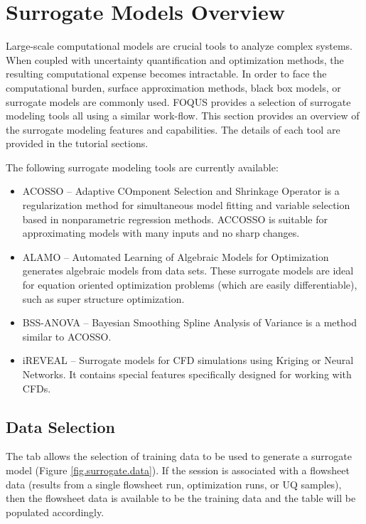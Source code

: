 \section{Surrogate Models Overview}

Large-scale computational models are crucial tools to analyze complex systems. When coupled with uncertainty quantification and optimization methods, the resulting computational expense becomes intractable. In order to face the computational burden, surface approximation methods, black box models, or surrogate models are commonly used. FOQUS provides a selection of surrogate modeling tools all using a similar work-flow. This section provides an overview of the surrogate modeling features and capabilities. The details of each tool are provided in the tutorial sections.

The following surrogate modeling tools are currently available:
\begin{itemize}
	\item ACOSSO -- Adaptive COmponent Selection and Shrinkage Operator is a regularization method for simultaneous model fitting and variable selection based in nonparametric regression methods. ACCOSSO is suitable for approximating models  with
     many inputs and no sharp changes.
	\item ALAMO -- Automated Learning of Algebraic Models for Optimization generates algebraic models from data sets. These surrogate models are ideal for equation
     oriented optimization problems (which are
     easily differentiable), such as super structure optimization.
	\item BSS-ANOVA -- Bayesian Smoothing Spline Analysis of Variance is a method similar to ACOSSO.
	\item iREVEAL -- Surrogate models for CFD simulations using Kriging or
     Neural Networks. It contains special features specifically designed
     for working with CFDs. 
\end{itemize}

\subsection{Data Selection}

The  tab allows the selection of training data to be used to generate a surrogate model (Figure \ref{fig.surrogate.data}). If the session is associated with a flowsheet data (results from a single flowsheet run, optimization runs, or UQ samples), then the flowsheet data is available to be the training data and the table will be populated accordingly.


